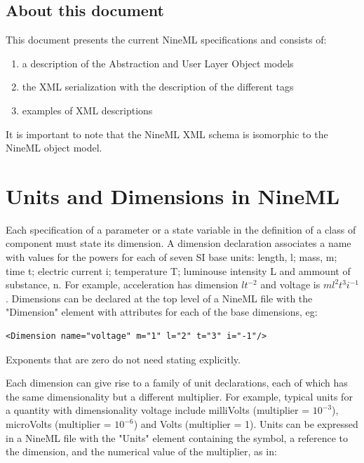 \documentclass{article}
\begin{document}
\subsection{About this document}

This document presents the current NineML specifications and consists of:
\begin{enumerate}
\item a description of the Abstraction and User Layer Object models
\item the XML serialization with the description of the different tags
\item examples of XML descriptions
\end{enumerate}

It is important to note that the NineML XML schema is isomorphic to the NineML
object model.

\section{Units and Dimensions in NineML}

\noindent
Each specification of a parameter or a state variable in the definition of a class of component must state its dimension. A dimension declaration associates a name with values for the powers for each of seven SI base units: length, l; mass, m; time t; electric current i; temperature T; luminouse intensity L and ammount of substance, n. 
For example, acceleration has dimension $lt^{-2}$ and voltage is $ml^2t^3i^{-1}$.  
Dimensions can be declared at the top level of a NineML file with the "Dimension" element with attributes for each of the base dimensions, eg:

\begin{lstlisting}[frame=none]
<Dimension name="voltage" m="1" l="2" t="3" i="-1"/>
\end{lstlisting}

\noindent
Exponents that are zero do not need stating explicitly.

Each dimension can give rise to a family of unit declarations, each of which has the same dimensionality but a different multiplier. For example, typical units for a quantity with dimensionality voltage include milliVolts (multiplier = $10^{-3}$), microVolts (multiplier = $10^{-6}$) and Volts (multiplier = 1). Units can be expressed in a NineML file with the "Units" element containing the symbol, a reference to the dimension, and the numerical value of the multiplier, as in:
\end{document}
